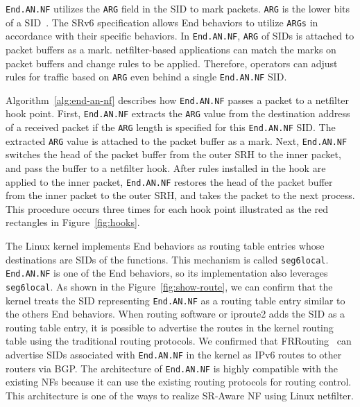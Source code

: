 \texttt{End.AN.NF} utilizes the \texttt{ARG} field in the SID to mark packets.
\texttt{ARG} is the lower bits of a SID~\cite{rfc8986}.
The SRv6 specification allows End behaviors to utilize \texttt{ARGs} in accordance with their specific behaviors.
In \texttt{End.AN.NF}, \texttt{ARG} of SIDs is attached to packet buffers as a mark.
netfilter-based applications can match the marks on packet buffers and change rules to be applied.
Therefore, operators can adjust rules for traffic based on \texttt{ARG} even behind a single \texttt{End.AN.NF} SID.

Algorithm~\ref{alg:end-an-nf} describes how \texttt{End.AN.NF} passes a packet to a netfilter hook point.
First, \texttt{End.AN.NF} extracts the \texttt{ARG} value from the destination address of a received packet if the \texttt{ARG} length is specified for this \texttt{End.AN.NF} SID.
The extracted \texttt{ARG} value is attached to the packet buffer as a mark.
Next, \texttt{End.AN.NF} switches the head of the packet buffer from the outer SRH to the inner packet, and pass the buffer to a netfilter hook.
After rules installed in the hook are applied to the inner packet, \texttt{End.AN.NF} restores the head of the packet buffer from the inner packet to the outer SRH, and takes the packet to the next process.
This procedure occurs three times for each hook point illustrated as the red rectangles in Figure~\ref{fig:hooks}.

The Linux kernel implements End behaviors as routing table entries whose destinations are SIDs of the functions.
\sloppy This mechanism is called \texttt{seg6local}.
\texttt{End.AN.NF} is one of the End behaviors, so its implementation also leverages \texttt{seg6local}.
As shown in the Figure~\ref{fig:show-route}, we can confirm that the kernel treats the SID representing \texttt{End.AN.NF} as a routing table entry similar to the others End behaviors.
When routing software or iproute2 adds the SID as a routing table entry, it is possible to advertise the routes in the kernel routing table using the traditional routing protocols.
We confirmed that FRRouting~\cite{frr} can advertise SIDs associated with \texttt{End.AN.NF} in the kernel as IPv6 routes to other routers via BGP.
The architecture of \texttt{End.AN.NF} is highly compatible with the existing NFs because it can use the existing routing protocols for routing control.
This architecture is one of the ways to realize SR-Aware NF using Linux netfilter.

